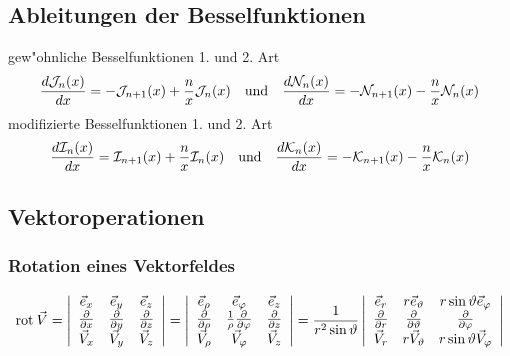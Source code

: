 \subsection{Ableitungen der Besselfunktionen}
gew"ohnliche Besselfunktionen 1. und 2. Art
$$\frac{d{\cal J}_n(x)}{dx}=-{\cal J}_{n+1}(x)+\frac{n}{x}{\cal J}_n(x) \quad
  {\rm und} \quad
      \frac{d{\cal N}_n(x)}{dx}=-{\cal N}_{n+1}(x)-\frac{n}{x}{\cal N}_n(x)$$
modifizierte Besselfunktionen 1. und 2. Art
$$\frac{d{\cal I}_n(x)}{dx}={\cal I}_{n+1}(x)+\frac{n}{x}{\cal I}_n(x) \quad
  {\rm und} \quad
      \frac{d{\cal K}_n(x)}{dx}=-{\cal K}_{n+1}(x)-\frac{n}{x}{\cal K}_n(x)$$
\subsection{Vektoroperationen}
\subsubsection{Rotation eines Vektorfeldes}
$${\rm rot \:}\vec{V}=\left|\begin{array}{ccc}\vec{e}_x&\vec{e}_y&\vec{e}_z\\
  \frac{\partial}{\partial x}&\frac{\partial}{\partial
  y}&\frac{\partial}{\partial z}\\ \vec{V}_x &
  \vec{V}_y&\vec{V}_z\\ \end{array}\right| =
  \left|\begin{array}{ccc}\vec{e}_{\rho}&\vec{e}_{\varphi}&\vec{e}_z\\
  \frac{\partial}{\partial \rho}&\frac{1}{\rho}\frac{\partial}{\partial
  \varphi}&\frac{\partial}{\partial z}\\
  \vec{V}_{\rho} &\vec{V}_{\varphi}&\vec{V}_z\\ \end{array}\right| =
  \frac{1}{r^2\sin\vartheta}
  \left|\begin{array}{ccc}
   \vec{e}_r&r\vec{e}_{\vartheta}&r\sin\vartheta\vec{e}_{\varphi}\\
   \frac{\partial}{\partial r}&\frac{\partial}{\partial \vartheta}
                              &\frac{\partial}{\partial \varphi}\\
   \vec{V}_r&r\vec{V}_{\vartheta}&r\sin\vartheta\vec{V}_{\varphi}\\
  \end{array}\right| $$

